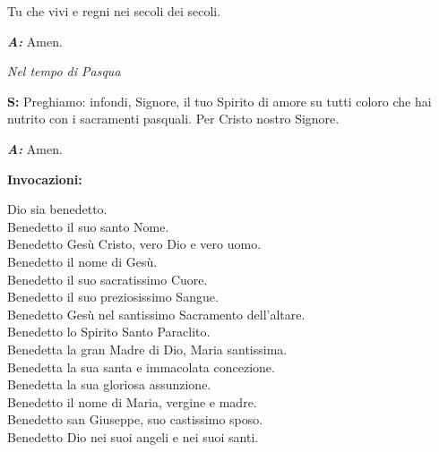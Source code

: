 Tu che vivi e regni nei secoli dei secoli.

\medskip

\emph{\textbf{A:}} Amen.

\medskip

\emph{Nel tempo di Pasqua}

\medskip

\textbf{S:} Preghiamo: infondi, Signore, il tuo Spirito di amore su tutti coloro che hai nutrito con i sacramenti pasquali. Per Cristo nostro Signore.

\medskip

\emph{\textbf{A:}} Amen.

\newpage

\textbf{\large{Invocazioni:}}

\medskip

Dio sia benedetto.\\
Benedetto il suo santo Nome.\\
Benedetto Gesù Cristo, vero Dio e vero uomo.\\
Benedetto il nome di Gesù.\\
Benedetto il suo sacratissimo Cuore.\\
Benedetto il suo preziosissimo Sangue.\\
Benedetto Gesù nel santissimo Sacramento dell'altare.\\
Benedetto lo Spirito Santo Paraclito.\\
Benedetta la gran Madre di Dio, Maria santissima.\\
Benedetta la sua santa e immacolata concezione.\\
Benedetta la sua gloriosa assunzione.\\
Benedetto il nome di Maria, vergine e madre.\\
Benedetto san Giuseppe, suo castissimo sposo.\\
Benedetto Dio nei suoi angeli e nei suoi santi.

